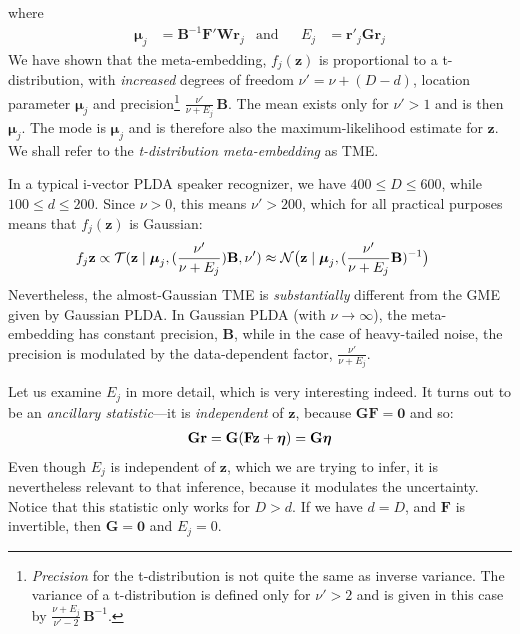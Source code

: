 \documentclass[a4paper,oneside,12pt,english]{report}
\def\zvec{\mathbf{z}}
\def\ND{\mathcal{N}}
\def\Bmat{\mathbf{B}}
\def\Wmat{\mathbf{W}}
\def\Fmat{\mathbf{F}}
\def\Gmat{\mathbf{G}}
\def\Gmat{\mathbf{G}}
\def\rvec{\mathbf{r}}
\def\muvec{\boldsymbol{\mu}}
\def\nulvec{\boldsymbol{0}}
\begin{document}
where
\begin{align}
\muvec_j &= \Bmat^{-1}\Fmat'\Wmat\rvec_j &\text{and} &&
E_j &= \rvec'_j\Gmat\rvec_j
\end{align}
We have shown that the meta-embedding, $f_j(\zvec)$ is proportional to a t-distribution, with \emph{increased} degrees of freedom $\nu'=\nu+(D-d)$, location parameter $\muvec_j$ and precision\footnote{\emph{Precision} for the t-distribution is not quite the same as inverse variance. The variance of a t-distribution is defined only for $\nu'>2$ and is given in this case by $\frac{\nu+E_j}{\nu'-2}\,\Bmat^{-1}$.} $\frac{\nu'}{\nu+E_j}\,\Bmat$. The mean exists only for $\nu'>1$ and is then $\muvec_j$. The mode is $\muvec_j$ and is therefore also the maximum-likelihood estimate for $\zvec$. We shall refer to the \emph{t-distribution meta-embedding} as TME.

In a typical i-vector PLDA speaker recognizer, we have $400\le D\le 600$, while $100\le d \le 200$. Since $\nu>0$, this means $\nu'>200$, which for all practical purposes means that $f_j(\zvec)$ is Gaussian:
\begin{align}
f_j{\zvec} &\propto \TD(\zvec\mid \muvec_j,(\frac{\nu'}{\nu+E_j})\Bmat,\nu')
\approx \ND\bigl(\zvec\mid\muvec_j,(\frac{\nu'}{\nu+E_j}\Bmat)^{-1}\bigr)
\end{align}
Nevertheless, the almost-Gaussian TME is \emph{substantially} different from the GME given by Gaussian PLDA. In Gaussian PLDA (with $\nu\to\infty$), the meta-embedding has constant precision, $\Bmat$, while in the case of heavy-tailed noise, the precision is modulated by the data-dependent factor, $\frac{\nu'}{\nu+E_j}$.   

Let us examine $E_j$ in more detail, which is very interesting indeed. It turns out to be an \emph{ancillary statistic}---it is \emph{independent} of $\zvec$, because $\Gmat\Fmat=\nulvec$ and so: 
\begin{align}
\Gmat\rvec=\Gmat(\Fmat\zvec+\etavec)=\Gmat\etavec
\end{align}
Even though $E_j$ is independent of $\zvec$, which we are trying to infer, it is nevertheless relevant to that inference, because it modulates the uncertainty. Notice that this statistic only works for $D> d$. If we have $d=D$, and $\Fmat$ is invertible, then $\Gmat=\nulvec$ and $E_j=0$.
\end{document}
